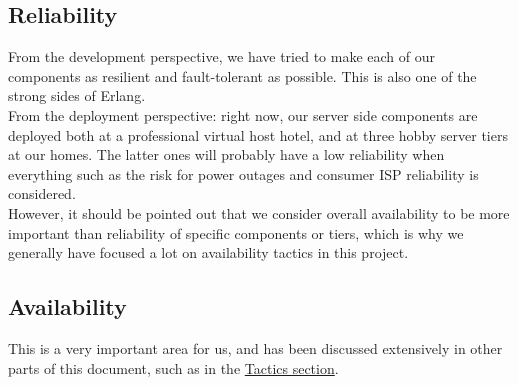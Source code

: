 \subsection{Reliability}
From the development perspective, we have tried to make each of our components
as resilient and fault-tolerant as possible. This is also one of the strong
sides of Erlang. \\

From the deployment perspective: right now, our server side components are
deployed both at a professional virtual host hotel, and at three hobby server
tiers at our homes. The latter ones will probably have a low reliability when
everything such as the risk for power outages and consumer ISP reliability is
considered. \\

However, it should be pointed out that we consider overall availability to be
more important than reliability of specific components or tiers, which is why we
generally have focused a lot on availability tactics in this project.

\subsection{Availability}
This is a very important area for us, and has been discussed extensively in
other parts of this document, such as in the \hyperlink{tactics}{Tactics
section}.